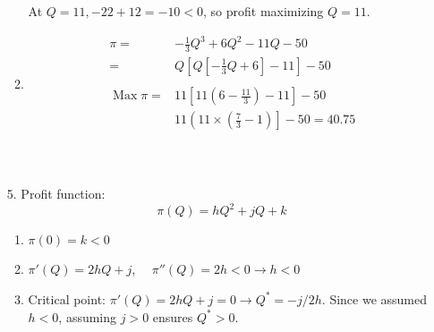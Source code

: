 \documentclass{./../../Latex/homework}
\begin{document}
\begin{enumerate}
\begin{enumerate}
At $Q=11,-22+12=-10<0$, so profit maximizing $Q=11$. \\
\item
$$
\begin{aligned}
\pi=&-\frac{1}{3} Q^{3}+6 Q^{2}-11 Q-50 \\
=& Q\left[Q\left[-\frac{1}{3} Q+6\right]-11\right]-50 \\~\\
\operatorname{Max} \pi=& 11\left[11\left(6-\frac{11}{3}\right)-11\right]-50 \\
& 11\left(11 \times\left(\frac{7}{3}-1\right)\right]-50 =40.75 \\
\end{aligned}
$$ \\~\\
\end{enumerate}

\item[5.] Profit function:
$$ \pi(Q) = hQ^2+jQ+k  $$
\begin{enumerate}
  \item $\pi(0) = k<0$
  \item $\pi'(Q) = 2hQ+j$, $\quad \pi''(Q) = 2h<0 \rightarrow h<0$
  \item Critical point: $\pi'(Q) = 2hQ+j=0 \rightarrow Q^* = -j/2h$. Since we assumed $h<0$, assuming $j>0$ ensures $Q^*>0$. 
\end{enumerate}
\end{enumerate}


\end{document}
